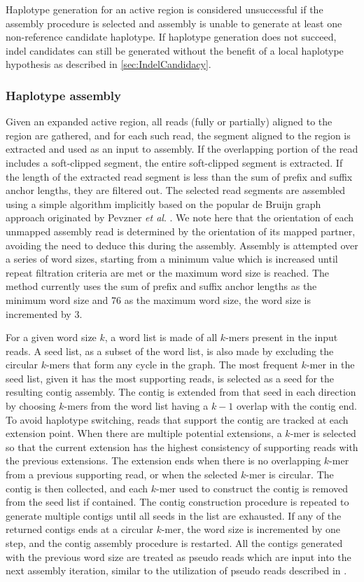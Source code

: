 \documentclass{article}
\begin{document}
Haplotype generation for an active region is considered unsuccessful if the assembly procedure is selected and assembly is unable to generate at least one non-reference candidate haplotype. If haplotype generation does not succeed, indel candidates can still be generated without the benefit of a local haplotype hypothesis as described in \ref{sec:IndelCandidacy}.

\subsubsection{Haplotype assembly}
\label{sec:HaplotypeAssembler}

Given an expanded active region, all reads (fully or partially) aligned to the region are gathered, and for each such read, the segment aligned to the region is extracted and used as an input to assembly. If the overlapping portion of the read includes a soft-clipped segment, the entire soft-clipped segment is extracted. If the length of the extracted read segment is less than the sum of prefix and suffix anchor lengths, they are filtered out. The selected read segments are assembled using a simple algorithm implicitly based on the popular de Bruijn graph approach originated by Pevzner \textit{et al}. \citep{pevzner2001}. We note here that the orientation of each unmapped assembly read is determined by the orientation of its mapped partner, avoiding the need to deduce this during the assembly. Assembly is attempted over a series of word sizes, starting from a minimum value which is increased until repeat filtration criteria are met or the maximum word size is reached. The method currently uses the sum of prefix and suffix anchor lengths as the minimum word size and 76 as the maximum word size, the word size is incremented by 3.

For a given word size $k$, a word list is made of all $k$-mers present in the input reads. A seed list, as a subset of the word list, is also made by excluding the circular $k$-mers that form any cycle in the graph. The most frequent $k$-mer in the seed list, given it has the most supporting reads, is selected as a seed for the resulting contig assembly. The contig is extended from that seed in each direction by choosing $k$-mers from the word list having a $k-1$ overlap with the contig end. To avoid haplotype switching, reads that support the contig are tracked at each extension point. When there are multiple potential extensions, a $k$-mer is selected so that the current extension has the highest consistency of supporting reads with the previous extensions. The extension ends when there is no overlapping $k$-mer from a previous supporting read, or when the selected $k$-mer is circular. The contig is then collected, and each $k$-mer used to construct the contig is removed from the seed list if contained. The contig construction procedure is repeated to generate multiple contigs until all seeds in the list are exhausted. If any of the returned contigs ends at a circular $k$-mer, the word size is incremented by one step, and the contig assembly procedure is restarted. All the contigs generated with the previous word size are treated as pseudo reads which are input into the next assembly iteration, similar to the utilization of pseudo reads described in \cite{tigra2014}.
\end{document}
